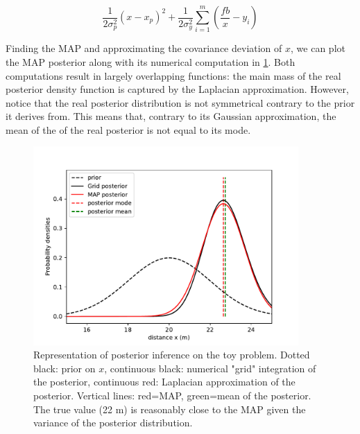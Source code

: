 \begin{equation}
    \frac{1}{2 \sigma_p^2}(x - x_p)^2 + \frac{1}{2\sigma_y^2} \sum_{i=1}^m (\frac{fb}{x} - y_i)
\end{equation}

Finding the MAP and approximating the covariance deviation of $x$, we can plot the MAP posterior along with its numerical computation in \ref{fig:MAP_stereo1D}. 
Both computations result in largely overlapping functions: the main mass of the real posterior density function is captured by the Laplacian approximation.
However, notice that the real posterior distribution is not symmetrical contrary to the prior it derives from. This means that, contrary to its Gaussian approximation, the mean of the
of the real posterior is not equal to its mode. 

\begin{figure}[h]
    \centering
    \includegraphics[width=0.9\textwidth]{figures/MAP_stereo1D.pdf}
    \caption{Representation of posterior inference on the toy problem. Dotted black: prior on $x$, 
    continuous black: numerical "grid" integration of the posterior, continuous red: Laplacian approximation of the posterior. 
    Vertical lines: red=MAP, green=mean of the posterior. The true value (22 m) is reasonably close to the MAP given the variance 
    of the posterior distribution.
    }
    \label{fig:MAP_stereo1D}
 \end{figure}




